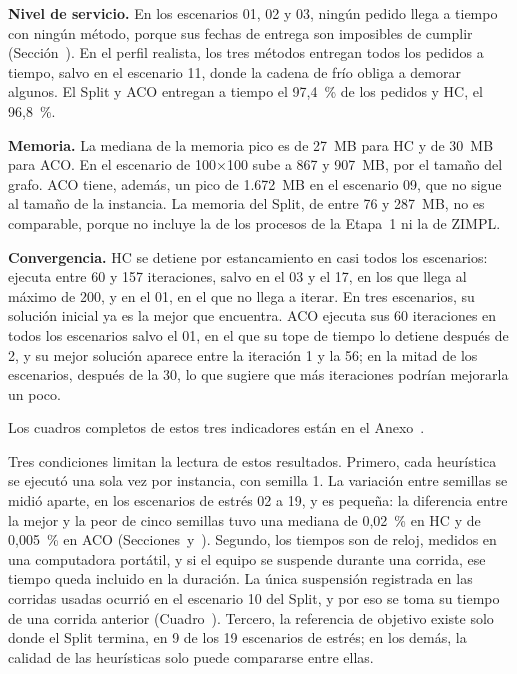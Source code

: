 \stopsubsection

\startsubsection[title={Nivel de servicio, memoria y convergencia}, reference=sec:res_memoria]

{\bf Nivel de servicio.} En los escenarios 01, 02 y 03, ningún pedido
llega a tiempo con ningún método, porque sus fechas de entrega son
imposibles de cumplir (Sección~). En
el perfil realista, los tres métodos entregan todos los pedidos a tiempo,
salvo en el escenario 11, donde la cadena de frío obliga a demorar algunos. El
Split y ACO entregan a tiempo el 97,4~\% de los pedidos y HC, el 96,8~\%.

{\bf Memoria.} La mediana de la memoria pico es de 27~MB para HC y de 30~MB
para ACO. En el escenario de 100×100 sube a 867 y 907~MB, por el tamaño del
grafo. ACO tiene, además, un pico de 1.672~MB en el escenario 09, que no
sigue al tamaño de la instancia. La memoria del Split, de
entre 76 y 287~MB, no es comparable, porque no incluye la de los procesos de
la Etapa~1 ni la de ZIMPL.

{\bf Convergencia.} HC se detiene por estancamiento en casi todos los
escenarios: ejecuta entre 60 y 157 iteraciones, salvo en el 03 y el 17, en
los que llega al máximo de 200, y en el 01, en el que no llega a iterar. En
tres escenarios, su solución inicial ya es la mejor que encuentra. ACO
ejecuta sus 60 iteraciones en todos los escenarios salvo el 01, en el que su
tope de tiempo lo detiene después de 2, y su mejor solución aparece entre la
iteración 1 y la 56; en la mitad de los escenarios, después de la 30, lo que
sugiere que más iteraciones podrían mejorarla un poco.

Los cuadros completos de estos tres indicadores están en el
Anexo~.

\stopsubsection

\startsubsection[title={Alcance de estos resultados}]

Tres condiciones limitan la lectura de estos resultados. Primero, cada
heurística se ejecutó una sola vez por instancia, con semilla 1. La
variación entre semillas se midió aparte, en los escenarios de estrés 02 a
19, y es pequeña: la diferencia entre la mejor y la peor de cinco semillas
tuvo una mediana de 0,02~\% en HC y de 0,005~\% en ACO
(Secciones~ y~).
Segundo, los tiempos son de reloj,
medidos en una computadora portátil, y si el equipo se suspende durante una
corrida, ese tiempo queda incluido en la duración. La única suspensión
registrada en las corridas usadas ocurrió en el escenario 10 del Split, y por
eso se toma su tiempo de una corrida anterior
(Cuadro~). Tercero, la
referencia de objetivo existe solo donde el Split termina, en 9 de los 19
escenarios de estrés; en los demás, la calidad de las heurísticas solo puede
compararse entre ellas.

